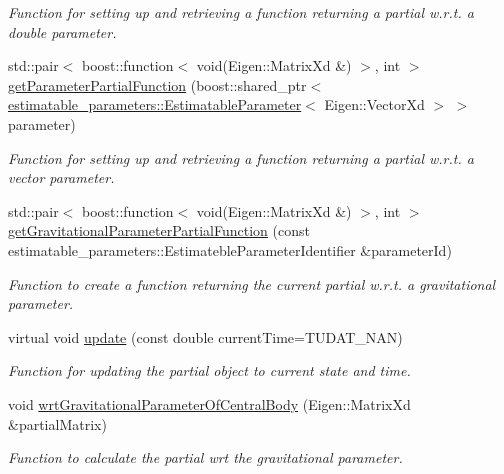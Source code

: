 \begin{DoxyCompactItemize}
\begin{DoxyCompactList}\small\item\em Function for setting up and retrieving a function returning a partial w.\+r.\+t. a double parameter. \end{DoxyCompactList}\item 
std\+::pair$<$ boost\+::function$<$ void(Eigen\+::\+Matrix\+Xd \&) $>$, int $>$ \hyperlink{classtudat_1_1acceleration__partials_1_1SphericalHarmonicsGravityPartial_a4d0928a600be68a36aaa3bc717ca77dd}{get\+Parameter\+Partial\+Function} (boost\+::shared\+\_\+ptr$<$ \hyperlink{classtudat_1_1estimatable__parameters_1_1EstimatableParameter}{estimatable\+\_\+parameters\+::\+Estimatable\+Parameter}$<$ Eigen\+::\+Vector\+Xd $>$ $>$ parameter)
\begin{DoxyCompactList}\small\item\em Function for setting up and retrieving a function returning a partial w.\+r.\+t. a vector parameter. \end{DoxyCompactList}\item 
std\+::pair$<$ boost\+::function$<$ void(Eigen\+::\+Matrix\+Xd \&) $>$, int $>$ \hyperlink{classtudat_1_1acceleration__partials_1_1SphericalHarmonicsGravityPartial_a5b8b703c91451cb4a47023f57ac8d49e}{get\+Gravitational\+Parameter\+Partial\+Function} (const estimatable\+\_\+parameters\+::\+Estimateble\+Parameter\+Identifier \&parameter\+Id)
\begin{DoxyCompactList}\small\item\em Function to create a function returning the current partial w.\+r.\+t. a gravitational parameter. \end{DoxyCompactList}\item 
virtual void \hyperlink{classtudat_1_1acceleration__partials_1_1SphericalHarmonicsGravityPartial_a581667836418faf4f1a6e9c79f898e6a}{update} (const double current\+Time=T\+U\+D\+A\+T\+\_\+\+N\+AN)
\begin{DoxyCompactList}\small\item\em Function for updating the partial object to current state and time. \end{DoxyCompactList}\item 
void \hyperlink{classtudat_1_1acceleration__partials_1_1SphericalHarmonicsGravityPartial_a3e6fdd2d0f18c427449292d9c9ad197c}{wrt\+Gravitational\+Parameter\+Of\+Central\+Body} (Eigen\+::\+Matrix\+Xd \&partial\+Matrix)
\begin{DoxyCompactList}\small\item\em Function to calculate the partial wrt the gravitational parameter. \end{DoxyCompactList}\end{DoxyCompactItemize}
